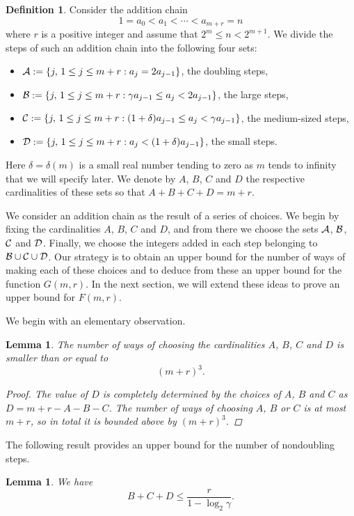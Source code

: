 \documentclass{article}
\newtheorem{lemma}[theorem]{Lemma}
\theoremstyle{definition}
\newtheorem{definition}{Definition}[section]
\begin{document}
\begin{definition} Consider the addition chain
$$
1=a_0<a_1<\cdots <a_{m+r}=n
$$
where $r$ is a positive integer and assume that $2^m\le n< 2^{m+1}$.  We divide the steps of such an addition chain into the following four sets:
\begin{itemize}
\item ${\cal A}:=\{j,\, 1\le j\le m+r:a_j=2a_{j-1}\}$, the doubling steps,
\item ${\cal B}:=\{j,\, 1\le j\le m+r:\gamma a_{j-1}\leq a_j<2a_{j-1}\}$, the large steps,
\item ${\cal C}:=\{j,\, 1\le j\le m+r:(1+\delta)a_{j-1}\leq a_j<\gamma a_{j-1}\}$, the medium-sized steps,
\item ${\cal D}:=\{j,\, 1\le j\le m+r:a_j<(1+\delta)a_{j-1}\}$, the small steps.
\end{itemize}
Here $\delta=\delta(m)$ is a small real number tending to zero as $m$ tends to infinity that we will specify later. We denote by $A$, $B$, $C$ and $D$ the respective cardinalities of these sets so that $A+B+C+D=m+r$.
\end{definition}
We consider an addition chain as the result of a series  of choices. We begin by fixing the cardinalities $A$, $B$, $C$ and $D$, and from there we   choose the sets ${\cal A}$, ${\cal B}$, ${\cal C}$ and ${\cal D}$. Finally, we choose the integers added in each step belonging to ${\cal B}\cup {\cal C}\cup {\cal D}$. Our strategy is to obtain an upper bound for the number of ways of making each of these choices and to deduce from these an upper bound for the function $G(m,r)$. In the next section, we will extend these ideas to prove an upper bound for $F(m,r)$.

We begin with an elementary observation.
\begin{lemma}\label{ub1}
The number of ways of choosing the cardinalities $A$, $B$, $C$ and $D$ is smaller than or equal to
$$
(m+r)^3.
$$
\begin{proof}
The value of $D$ is completely determined by the choices of $A$, $B$ and $C$ as $D=m+r-A-B-C$.  The number of ways of choosing $A$, $B$ or $C$ is at most $m+r$, so in total it is bounded above by $(m+r)^3$.
\end{proof}
\end{lemma}

The following result provides an upper bound for the number of nondoubling steps.
\begin{lemma}\label{ub2}
We have
$$
B+C+D\le \frac{r}{1-\log_2 \gamma}.
$$
\end{lemma}
\end{document}
